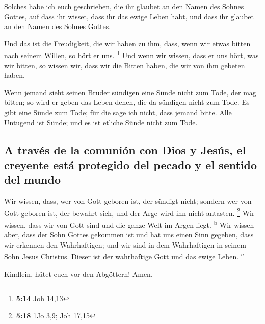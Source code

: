  Solches habe ich euch geschrieben, die ihr glaubet an
den Namen des Sohnes Gottes, auf dass ihr wisset, dass ihr das ewige
Leben habt, und dass ihr glaubet an den Namen des Sohnes Gottes.

 Und das ist die Freudigkeit, die wir haben zu ihm, dass,
wenn wir etwas bitten nach seinem Willen, so hört er uns. \footnote{\textbf{5:14}
  Joh 14,13}  Und wenn wir wissen, dass er uns hört, was
wir bitten, so wissen wir, dass wir die Bitten haben, die wir von ihm
gebeten haben.

 Wenn jemand sieht seinen Bruder sündigen eine Sünde
nicht zum Tode, der mag bitten; so wird er geben das Leben denen, die da
sündigen nicht zum Tode. Es gibt eine Sünde zum Tode; für die sage ich
nicht, dass jemand bitte.  Alle Untugend ist Sünde; und
es ist etliche Sünde nicht zum Tode.

\hypertarget{a-travuxe9s-de-la-comuniuxf3n-con-dios-y-jesuxfas-el-creyente-estuxe1-protegido-del-pecado-y-el-sentido-del-mundo}{%
\subsection{A través de la comunión con Dios y Jesús, el creyente está
protegido del pecado y el sentido del
mundo}\label{a-travuxe9s-de-la-comuniuxf3n-con-dios-y-jesuxfas-el-creyente-estuxe1-protegido-del-pecado-y-el-sentido-del-mundo}}

 Wir wissen, dass, wer von Gott geboren ist, der sündigt
nicht; sondern wer von Gott geboren ist, der bewahrt sich, und der Arge
wird ihn nicht antasten. \footnote{\textbf{5:18} 1Jo 3,9; Joh 17,15}
 Wir wissen, dass wir von Gott sind und die ganze Welt im
Argen liegt. \textsuperscript{b}  Wir wissen aber, dass
der Sohn Gottes gekommen ist und hat uns einen Sinn gegeben, dass wir
erkennen den Wahrhaftigen; und wir sind in dem Wahrhaftigen in seinem
Sohn Jesus Christus. Dieser ist der wahrhaftige Gott und das ewige
Leben. \textsuperscript{c}

 Kindlein, hütet euch vor den Abgöttern! Amen.
